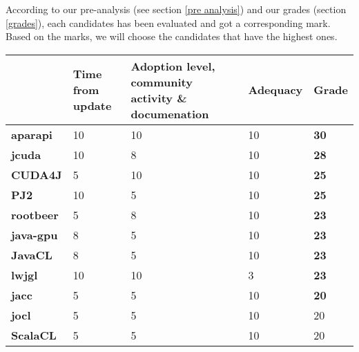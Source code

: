 According to our pre-analysis (see section \ref{pre analysis}) and our grades (section \ref{grades}), each candidates has been evaluated and got a corresponding mark. Based on the marks, we will choose the candidates that have the highest ones.

\begin{longtable}{ | p{} | p{} | p{} | p{} | p{} | }
  
  \hline
  
  & Time from update & Adoption level, community activity \& documenation & Adequacy & \textbf{Grade} \\
  
  \hline \hline
  
  \textbf{aparapi} &
  10 &
  10 &
  10 &
  \textbf{30} \\
  
  \hline \hline
  
  \textbf{jcuda} &
  10 &
  8 &
  10 &
  \textbf{28} \\
  
  \hline \hline
  
  \textbf{CUDA4J} &
  5 &
  10 &
  10 &
  \textbf{25} \\
  
  \hline \hline
 
  \textbf{PJ2} &
  10 &
  5 &
  10 &
  \textbf{25} \\
  
  \hline \hline

  \textbf{rootbeer} &
  5 &
  8 &
  10 & 
  \textbf{23} \\
  
  \hline \hline
  
  \textbf{java-gpu} &
  8 &
  5 &
  10 &
  \textbf{23} \\
  
  \hline \hline
  
  \textbf{JavaCL} &
  8 &
  5 &
  10 &
  \textbf{23} \\
  
  \hline \hline
  
  \textbf{lwjgl} &
  10 &
  10 &
  3 &
  \textbf{23} \\
  
  \hline \hline
  
  \textbf{jacc} &
  5 &
  5 &
  10 &
  \textbf{20} \\
  
  \hline \hline
  
  \textbf{jocl} &
  5 &
  5 &
  10 &
  20 \\
  
  \hline \hline
  
  \textbf{ScalaCL} &
  5 &
  5 &
  10 &
  20 \\
  
  \hline

\end{longtable}